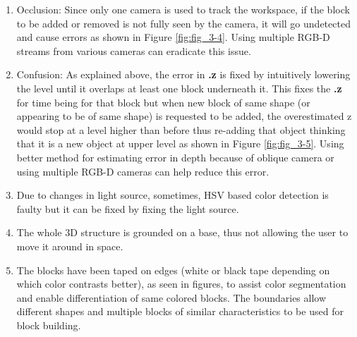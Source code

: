\begin{enumerate}
    \item Occlusion: Since only one camera is used to track the workspace, if the block to be added or removed is not fully seen by the camera, it will go undetected and cause errors as shown in Figure \ref{fig:fig_3-4}. Using multiple RGB-D streams from various cameras can eradicate this issue. 
    \item Confusion: As explained above, the error in \textbf{.z} is fixed by intuitively lowering the level until it overlaps at least one block underneath it. This fixes the \textbf{.z} for time being for that block but when new block of same shape (or appearing to be of same shape) is requested to be added, the overestimated z would stop at a level higher than before thus re-adding that object thinking that it is a new object at upper level as shown in Figure \ref{fig:fig_3-5}. Using better method for estimating error in depth because of oblique camera or using multiple RGB-D cameras can help reduce this error.
    \item Due to changes in light source, sometimes, HSV based color detection is faulty but it can be fixed by fixing the light source.
    \item The whole 3D structure is grounded on a base, thus not allowing the user to move it around in space. 
    \item The blocks have been taped on edges (white or black tape depending on which color contrasts better), as seen in figures, to assist color segmentation and enable differentiation of same colored blocks. The boundaries allow different shapes and multiple blocks of similar characteristics to be used for block building. 
\end{enumerate}
